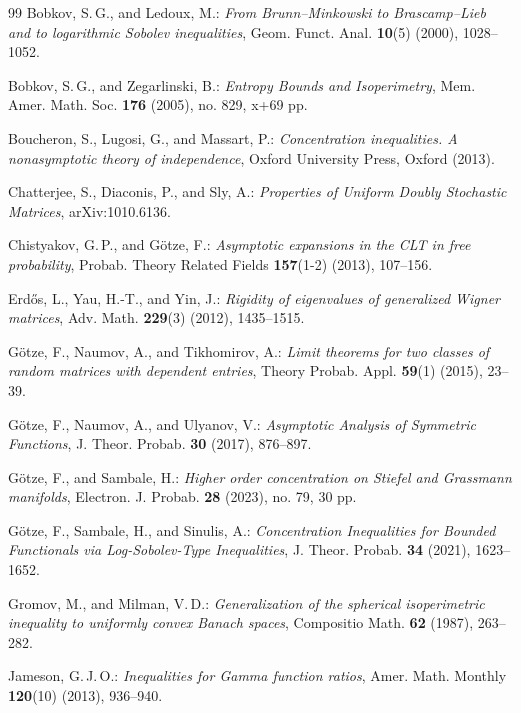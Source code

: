 \documentclass[a4paper,12pt]{amsart}
\numberwithin{equation}{section}
\theoremstyle{remark}
\begin{document}
\begin{thebibliography}{99}
 Bobkov, S.\,G., and Ledoux, M.: \emph{From Brunn--Minkowski to Brascamp--Lieb and to logarithmic Sobolev inequalities}, Geom. Funct. Anal. \textbf{10}(5) (2000), 1028--1052.

 Bobkov, S.\,G., and Zegarlinski, B.: \emph{Entropy Bounds and Isoperimetry}, Mem. Amer. Math. Soc. \textbf{176} (2005), no. 829, x+69 pp.

 Boucheron, S., Lugosi, G., and Massart, P.: \emph{Concentration inequalities. A nonasymptotic theory of independence}, Oxford University Press, Oxford (2013).

 Chatterjee, S., Diaconis, P., and Sly, A.: \emph{Properties of Uniform Doubly Stochastic Matrices}, arXiv:1010.6136.

 Chistyakov, G.\,P., and G\"{o}tze, F.: \emph{Asymptotic expansions in the CLT in free probability}, Probab. Theory Related Fields \textbf{157}(1-2) (2013), 107--156.

 Erd\H{o}s, L., Yau, H.-T., and Yin, J.: \emph{Rigidity of eigenvalues of generalized Wigner matrices}, Adv. Math. \textbf{229}(3) (2012), 1435--1515.

 G\"{o}tze, F., Naumov, A., and Tikhomirov, A.: \emph{Limit theorems for two classes of random matrices with dependent entries}, Theory Probab. Appl. \textbf{59}(1) (2015), 23--39.

 G\"{o}tze, F., Naumov, A., and Ulyanov, V.: \emph{Asymptotic Analysis of Symmetric Functions}, J. Theor. Probab. \textbf{30} (2017), 876--897.

 G\"{o}tze, F., and Sambale, H.: \emph{Higher order concentration on Stiefel and Grassmann manifolds}, Electron. J. Probab. \textbf{28} (2023), no. 79, 30 pp.

 G\"{o}tze, F., Sambale, H., and Sinulis, A.: \emph{Concentration Inequalities for Bounded Functionals via Log-Sobolev-Type Inequalities}, J. Theor. Probab. \textbf{34} (2021), 1623--1652.

 Gromov, M., and Milman, V.\,D.: \emph{Generalization of the spherical isoperimetric inequality to uniformly convex Banach spaces}, Compositio Math. \textbf{62} (1987), 263--282.

 Jameson, G.\,J.\,O.: \emph{Inequalities for Gamma function ratios}, Amer. Math. Monthly \textbf{120}(10) (2013), 936--940.


\end{thebibliography}
\end{document}
